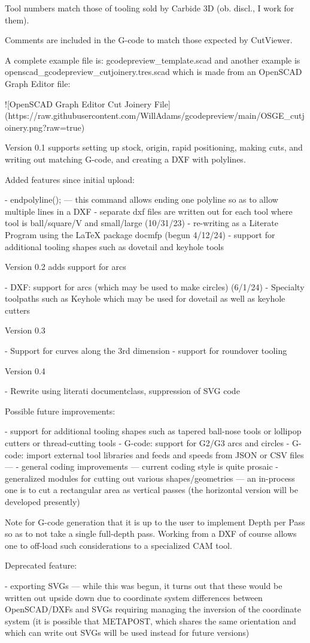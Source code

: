 \documentclass{ltxdoc}
\begin{document}
\begin{readme}
Tool numbers match those of tooling sold by Carbide 3D 
(ob. discl., I work for them). 

Comments are included in the G-code to match those 
expected by CutViewer.

A complete example file is: gcodepreview_template.scad 
and another example is openscad_gcodepreview_cutjoinery.tres.scad 
which is made from an OpenSCAD Graph Editor file:

![OpenSCAD Graph Editor Cut Joinery File](https://raw.githubusercontent.com/WillAdams/gcodepreview/main/OSGE_cutjoinery.png?raw=true)

Version 0.1 supports setting up stock, origin, rapid 
positioning, making cuts, and writing out matching 
G-code, and creating a DXF with polylines.

Added features since initial upload:

 - endpolyline(); --- this command allows ending one polyline so as to allow multiple lines in a DXF
 - separate dxf files are written out for each tool where tool is ball/square/V and small/large (10/31/23)
 - re-writing as a Literate Program using the LaTeX package docmfp (begun 4/12/24) 
 - support for additional tooling shapes such as dovetail and keyhole tools

Version 0.2 adds support for arcs 

 - DXF: support for arcs (which may be used to make circles) (6/1/24)
 - Specialty toolpaths such as Keyhole which may be used for dovetail as well as keyhole cutters

Version 0.3 

 - Support for curves along the 3rd dimension
 - support for roundover tooling
 
Version 0.4

 - Rewrite using literati documentclass, suppression of SVG code

Possible future improvements:

 - support for additional tooling shapes such as tapered ball-nose tools or lollipop cutters or thread-cutting tools
 - G-code: support for G2/G3 arcs and circles
 - G-code: import external tool libraries and feeds and speeds from JSON or CSV files ---
 - general coding improvements --- current coding style is quite prosaic
 - generalized modules for cutting out various shapes/geometries --- an in-process one is to cut a rectangular area as vertical passes (the horizontal version will be developed presently)

Note for G-code generation that it is up to the user 
to implement Depth per Pass so as to not take a 
single full-depth pass. Working from a DXF of course 
allows one to off-load such considerations to a 
specialized CAM tool.

Deprecated feature:

 - exporting SVGs --- while this was begun, it turns out that these would be written out upside down due to coordinate system differences between OpenSCAD/DXFs and SVGs requiring managing the inversion of the coordinate system (it is possible that METAPOST, which shares the same orientation and which can write out SVGs will be used instead for future versions)

\end{readme}
\end{document}
